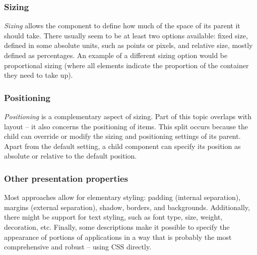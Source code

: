 \subsubsection{Sizing}
\emph{Sizing} allows the component to define how much of the space of its parent it should take.
There usually seem to be at least two options available: fixed size, defined in some absolute units, such as points or pixels, and relative size, mostly defined as percentages.
An example of a different sizing option would be proportional sizing (where all elements indicate the proportion of the container they need to take up).

\subsubsection{Positioning}
\emph{Positioning} is a complementary aspect of sizing.
Part of this topic overlaps with layout -- it also concerns the positioning of items.
This split occurs because the child can override or modify the sizing and positioning settings of its parent.
Apart from the default setting, a child component can specify its position as absolute or relative to the default position.

\subsubsection{Other presentation properties}
Most approaches allow for elementary styling: padding (internal separation), margins (external separation), shadow, borders, and backgrounds.
Additionally, there might be support for text styling, such as font type, size, weight, decoration, etc.
Finally, some descriptions make it possible to specify the appearance of portions of applications in a way that is probably the most comprehensive and robust -- using CSS directly.
